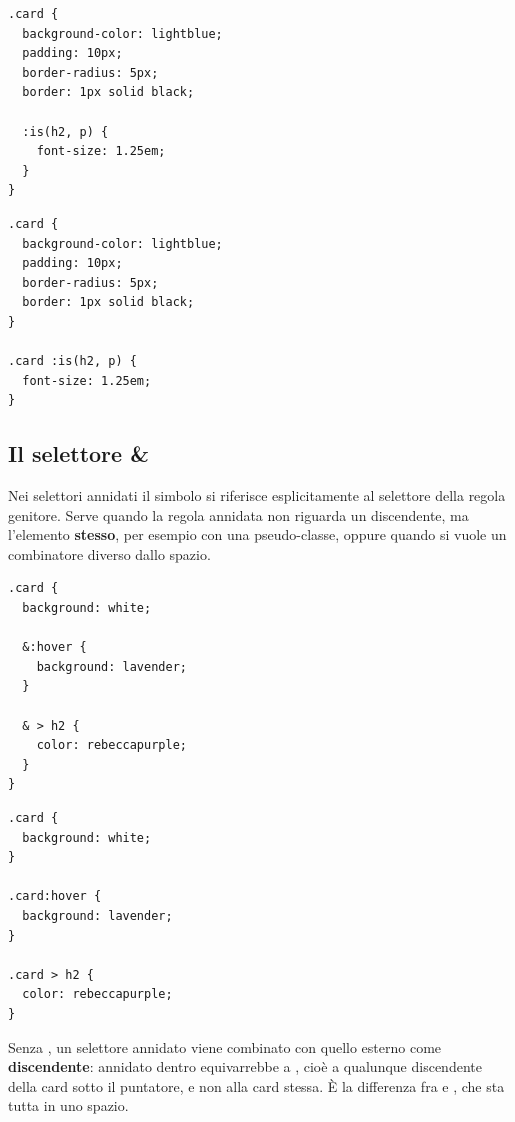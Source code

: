 \begin{affianco}[0.5][c]
\begin{lstlisting}[style=css, name=annidato.css]
.card {
  background-color: lightblue;
  padding: 10px;
  border-radius: 5px;
  border: 1px solid black;

  :is(h2, p) {
    font-size: 1.25em;
  }
}
\end{lstlisting}
\risultato
\begin{lstlisting}[style=css, name=equivalente.css]
.card {
  background-color: lightblue;
  padding: 10px;
  border-radius: 5px;
  border: 1px solid black;
}

.card :is(h2, p) {
  font-size: 1.25em;
}
\end{lstlisting}
\end{affianco}

\subsection{Il selettore \&}

Nei selettori annidati il simbolo \code{\&} si riferisce esplicitamente al
selettore della regola genitore. Serve quando la regola annidata non riguarda
un discendente, ma l'elemento \textbf{stesso}, per esempio con una
pseudo-classe, oppure quando si vuole un combinatore diverso dallo spazio.

\begin{affianco}[0.5][c]
\begin{lstlisting}[style=css, name=nesting.css]
.card {
  background: white;

  &:hover {
    background: lavender;
  }

  & > h2 {
    color: rebeccapurple;
  }
}
\end{lstlisting}
\risultato
\begin{lstlisting}[style=css, name=equivalente.css]
.card {
  background: white;
}

.card:hover {
  background: lavender;
}

.card > h2 {
  color: rebeccapurple;
}
\end{lstlisting}
\end{affianco}

Senza \code{\&}, un selettore annidato viene combinato con quello esterno come
\textbf{discendente}:  annidato dentro  equivarrebbe a
, cioè a qualunque discendente della card sotto il
puntatore, e non alla card stessa. È la differenza fra  e
, che sta tutta in uno spazio.

